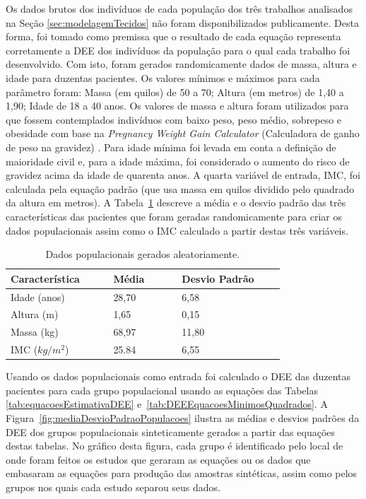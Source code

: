 Os dados brutos dos indivíduos de cada população dos três trabalhos analisados na Seção \ref{sec:modelagemTecidos} não foram disponibilizados publicamente. Desta forma, foi tomado como premissa que o resultado de cada equação representa corretamente a \acrshort{DEE} dos indivíduos da população para o qual cada trabalho foi desenvolvido. Com isto, foram gerados randomicamente dados de massa, altura e idade para duzentas pacientes. Os valores mínimos e máximos para cada parâmetro foram: Massa (em quilos) de 50 a 70; Altura (em metros) de 1,40 a 1,90; Idade de 18 a 40 anos. Os valores de massa e altura foram utilizados para que fossem contemplados indivíduos com baixo peso, peso médio, sobrepeso e obesidade com base na \textit{Pregnancy Weight Gain Calculator} (Calculadora de ganho de peso na gravidez) \cite{MTILLC2019}. Para idade mínima foi levada em conta a definição de maioridade civil e, para a idade máxima, foi considerado o aumento do risco de gravidez acima da idade de quarenta anos. A quarta variável de entrada, \acrshort{IMC}, foi calculada pela equação padrão (que usa massa em quilos dividido pelo quadrado da altura em metros).  A Tabela~\ref{tab:DadosPopulacaoGerada} descreve a média e o desvio padrão das três características das pacientes que foram geradas randomicamente para criar os dados populacionais assim como o \acrshort{IMC} calculado a partir destas três variáveis. 

\begin{table}[!ht]
\begin{center}
\caption{Dados populacionais gerados aleatoriamente.}
\label{tab:DadosPopulacaoGerada}
\begin{tabular}{|p{0.3\linewidth}|p{0.2\linewidth}|p{0.3\linewidth}|}
\hline
\textbf{Característica} & \textbf{Média} & \textbf{Desvio Padrão}\\
\hline\hline
Idade (anos) & 28,70 & 6,58\\
Altura (m) & 1,65 & 0,15\\
Massa (kg) & 68,97 & 11,80\\
IMC ($kg/m^2$) & 25.84 & 6,55\\
\hline
\end{tabular}
\end{center}
\end{table}

Usando os dados populacionais como entrada foi calculado o \acrshort{DEE} das duzentas pacientes para cada grupo populacional usando as equações das Tabelas \ref{tab:equacoesEstimativaDEE} e~\ref{tab:DEEEquacoesMinimosQuadrados}. A Figura~\ref{fig:mediaDesvioPadraoPopulacoes} ilustra as médias e desvios padrões da \acrshort{DEE} dos grupos populacionais sinteticamente gerados a partir das equações destas tabelas. No gráfico desta figura, cada grupo é identificado pelo local de onde  foram feitos os estudos que geraram as equações ou os dados que embasaram as equações para produção das amostras sintéticas, assim como pelos grupos nos quais cada estudo separou seus dados.

